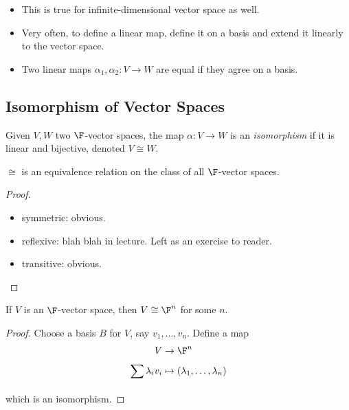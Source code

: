 \documentclass[a4paper]{article}
\theoremstyle{definition}
\begin{document}
\begin{note}\leavevmode
  \begin{itemize}
  \item This is true for infinite-dimensional vector space as well.
  \item Very often, to define a linear map, define it on a basis and extend it linearly to the vector space.
  \item Two linear maps \(\alpha_1,\alpha_2: V\to W\) are equal if they agree on a basis.
  \end{itemize}
\end{note}

\subsection{Isomorphism of Vector Spaces}

\begin{defi}
  Given \(V, W\) two \(\F\)-vector spaces, the map \(\alpha:V\to W\) is an \emph{isomorphism} if it is linear and bijective, denoted \(V \cong W\).
\end{defi}

\begin{lem}
  \(\cong\) is an equivalence relation on the class of all \(\F\)-vector spaces.
\end{lem}

\begin{proof}\leavevmode
  \begin{itemize}
  \item symmetric: obvious.
  \item reflexive: blah blah in lecture. Left as an exercise to reader.
  \item transitive: obvious.
  \end{itemize}
\end{proof}

\begin{thm}
  If \(V\) is an \(\F\)-vector space, then \(V \cong \F^n\) for some \(n\).
\end{thm}

\begin{proof}
  Choose a basis \(B\) for \(V\), say \(v_1,\ldots, v_n\). Define a map
  \begin{align*}
    V &\to \F^n \\
    \sum_{}^{ }\lambda_iv_i &\mapsto (\lambda_1,\ldots,\lambda_n)
  \end{align*}
which is an isomorphism.
\end{proof}
\end{document}
